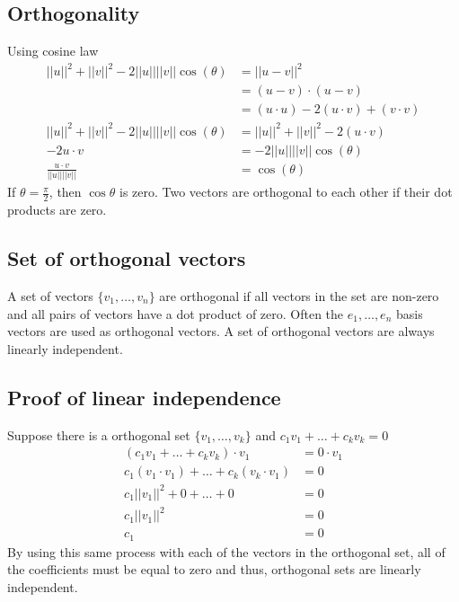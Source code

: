 \documentclass{article}
\theoremstyle{mytheoremstyle}
\theoremstyle{mytheoremstyle}
\theoremstyle{myproblemstyle}
\begin{document}
    \subsection*{Orthogonality}
    Using cosine law
    \begin{align*}
        ||u||^2 + ||v||^2 - 2||u||||v||\cos(\theta)
        &= ||u-v||^2 \\
        &= (u-v)\cdot(u-v) \\
        &= (u\cdot u) - 2(u \cdot v) + (v\cdot v) \\
        ||u||^2 + ||v||^2 - 2||u||||v||\cos(\theta)
        &= ||u||^2  + ||v||^2 - 2(u\cdot v) \\
        -2u\cdot v &= -2 ||u|| ||v|| \cos(\theta) \\
        \frac{u\cdot v}{||u|| ||v||}&=  \cos(\theta)
    \end{align*}
    If $\theta = \frac{\pi}{2}$, then $\cos\theta$ is zero. Two vectors are orthogonal
    to each other if their dot products are zero.

    \subsection*{Set of orthogonal vectors}
    A set of vectors $\{v_1,\dots,v_n\}$ are orthogonal if all vectors in the
    set are non-zero and all pairs of vectors have a dot product of zero. Often
    the $e_1,\dots,e_n$ basis vectors are used as orthogonal vectors. A set of
    orthogonal vectors are always linearly independent.

    \subsection*{Proof of linear independence}
    Suppose there is a orthogonal set $\{v_1,\dots,v_k\}$ and $c_1v_1+\dots+c_kv_k = 0$
    \begin{align*}
        (c_1v_1+\dots+c_kv_k) \cdot v_1 &= 0 \cdot v_1 \\
        c_1(v_1\cdot v_1)+\dots+c_k(v_k\cdot v_1) &= 0 \\
        c_1||v_1||^2+0+\dots+0 &= 0 \\
        c_1||v_1||^2 &= 0 \\
        c_1 &= 0
    \end{align*}
    By using this same process with each of the vectors in the orthogonal set,
    all of the coefficients must be equal to zero and thus, orthogonal sets are
    linearly independent.
\end{document}
